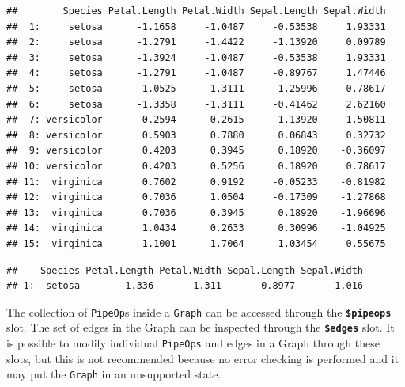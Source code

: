 \documentclass[
]{scrbook}
\newenvironment{Shaded}{\begin{snugshade}}{\end{snugshade}}
\newcommand{\DecValTok}[1]{\textcolor[rgb]{0.00,0.00,0.81}{#1}}
\newcommand{\FunctionTok}[1]{\textcolor[rgb]{0.00,0.00,0.00}{#1}}
\newcommand{\NormalTok}[1]{#1}
\newcommand{\SpecialCharTok}[1]{\textcolor[rgb]{0.00,0.00,0.00}{#1}}
\renewenvironment{Shaded} {\begin{snugshade}\small} {\end{snugshade}}
\begin{document}
\begin{Shaded}
\end{Shaded}

\begin{verbatim}
##        Species Petal.Length Petal.Width Sepal.Length Sepal.Width
##  1:     setosa      -1.1658     -1.0487     -0.53538     1.93331
##  2:     setosa      -1.2791     -1.4422     -1.13920     0.09789
##  3:     setosa      -1.3924     -1.0487     -0.53538     1.93331
##  4:     setosa      -1.2791     -1.0487     -0.89767     1.47446
##  5:     setosa      -1.0525     -1.3111     -1.25996     0.78617
##  6:     setosa      -1.3358     -1.3111     -0.41462     2.62160
##  7: versicolor      -0.2594     -0.2615     -1.13920    -1.50811
##  8: versicolor       0.5903      0.7880      0.06843     0.32732
##  9: versicolor       0.4203      0.3945      0.18920    -0.36097
## 10: versicolor       0.4203      0.5256      0.18920     0.78617
## 11:  virginica       0.7602      0.9192     -0.05233    -0.81982
## 12:  virginica       0.7036      1.0504     -0.17309    -1.27868
## 13:  virginica       0.7036      0.3945      0.18920    -1.96696
## 14:  virginica       1.0434      0.2633      0.30996    -1.04925
## 15:  virginica       1.1001      1.7064      1.03454     0.55675
\end{verbatim}

\begin{Shaded}
\end{Shaded}

\begin{verbatim}
##    Species Petal.Length Petal.Width Sepal.Length Sepal.Width
## 1:  setosa       -1.336      -1.311      -0.8977       1.016
\end{verbatim}

The collection of \texttt{PipeOp}s inside a \texttt{Graph} can be accessed through the \textbf{\texttt{\$pipeops}} slot.
The set of edges in the Graph can be inspected through the \textbf{\texttt{\$edges}} slot.
It is possible to modify individual \texttt{PipeOps} and edges in a Graph through these slots, but this is not recommended because no error checking is performed and it may put the \texttt{Graph} in an unsupported state.
\end{document}
